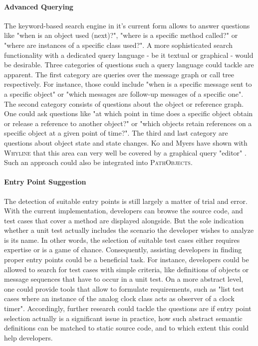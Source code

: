 \paragraph{Advanced Querying} The keyword-based search engine in it's current form allows to answer questions like "when is an object used (next)?", "where is a specific method called?" or "where are instances of a specific class used?".
A more sophisticated search functionality with a dedicated query language - be it textual or graphical - would be desirable.
Three categories of questions such a query language could tackle are apparent.
The first category are queries over the message graph or call tree respectively.
For instance, those could include "when is a specific message sent to a specific object" or "which messages are follow-up messages of a specific one".
The second category consists of questions about the object or reference graph.
One could ask questions like "at which point in time does a specific object obtain or release a reference to another object?" or "which objects retain references on a specific object at a given point of time?".
The third and last category are questions about object state and state changes.
Ko and Myers have shown with \textsc{Whyline} that this area can very well be covered by a graphical query "editor" \cite{ko_debugging_2008}.
Such an approach could also be integrated into \textsc{PathObjects}.

\paragraph{Entry Point Suggestion} The detection of suitable entry points is still largely a matter of trial and error.
With the current implementation, developers can browse the source code, and test cases that cover a method are displayed alongside.
But the sole indication whether a unit test actually includes the scenario the developer wishes to analyze is its name.
In other words, the selection of suitable test cases either requires expertise or is a game of chance.
Consequently, assisting developers in finding proper entry points could be a beneficial task.
For instance, developers could be allowed to search for test cases with simple criteria, like definitions of objects or message sequences that have to occur in a unit test.
On a more abstract level, one could provide tools that allow to formulate requirements, such as "list test cases where an instance of the analog clock class acts as observer of a clock timer".
Accordingly, further research could tackle the questions are if entry point selection actually is a significant issue in practice, how such abstract semantic definitions can be matched to static source code, and to which extent this could help developers.